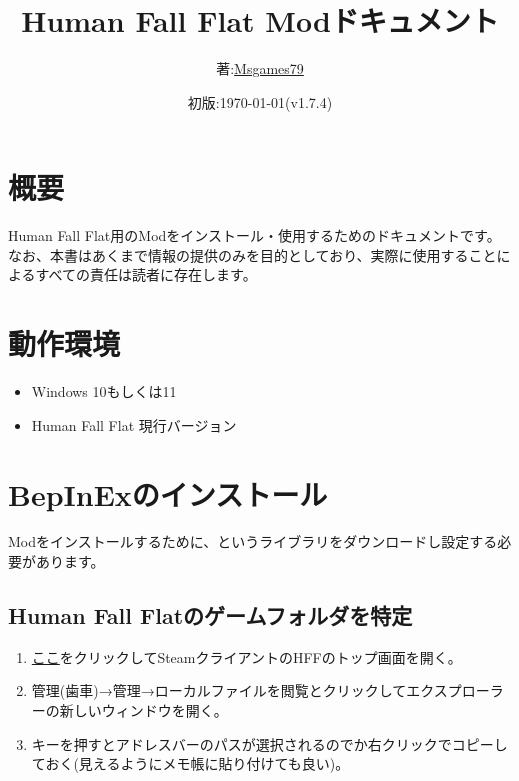 \documentclass[lualatex,a4paper,fontsize=11pt,jafontscale=0.9247,titlepage,oneside]{jlreq}
\begin{document}
\title{Human Fall Flat Modドキュメント}
\author{著:\;\href{https://www.youtube.com/channel/UCKpnq5EXLCcuPsEGAjyXbsg}{Msgames79}}
\date{初版:\;\today(v1.7.4)}
\maketitle
{}\par
{}
\tableofcontents
\clearpage
\section{概要}
Human Fall Flat用のModをインストール・使用するためのドキュメントです。なお、本書はあくまで情報の提供のみを目的としており、実際に使用することによるすべての責任は読者に存在します。
\section{動作環境}
\begin{itemize}
\item Windows 10もしくは11
\item Human Fall Flat 現行バージョン
\end{itemize}
\section{BepInExのインストール}
Modをインストールするために、というライブラリをダウンロードし設定する必要があります。
\subsection{Human Fall Flatのゲームフォルダを特定}
\begin{enumerate}
\item \href{steam://open/games/details/477160}{ここ}をクリックしてSteamクライアントのHFFのトップ画面を開く。
\item \label{3.1.2}管理(歯車)→管理→ローカルファイルを閲覧とクリックしてエクスプローラーの新しいウィンドウを開く。
\item \label{3.1.3}キーを押すとアドレスバーのパスが選択されるのでか右クリックでコピーしておく(見えるようにメモ帳に貼り付けても良い)。
\end{enumerate}
\end{document}

